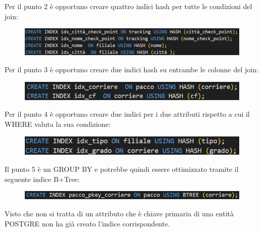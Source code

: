 \noindent Per il punto 2 è opportuno creare quattro indici hash per tutte le condizioni del join:
\begin{figure}[H]
\centering
\includegraphics[width=0.8 \textwidth]{Resources/INDEX2.png}
\label{I2}
\end{figure}

\noindent Per il punto 3 è opportuno creare due indici hash su entrambe le colonne del join:

\begin{figure}[H]
\centering
\includegraphics[width=0.8 \textwidth]{Resources/INDEX3.png}
\label{I3}
\end{figure}

\noindent Per il punto 4 è opportuno creare due indici per i due attributi rispetto a cui il WHERE valuta la sua condizione:

\begin{figure}[H]
\centering
\includegraphics[width=1 \textwidth]{Resources/INDEX4.png}
\label{I4}
\end{figure}

\noindent Il punto 5 è un GROUP BY e potrebbe quindi essere ottimizzato tramite il seguente indice B+Tree:
 
\begin{figure}[H]
\centering
\includegraphics[width=1 \textwidth]{Resources/INDEX5.png}
\label{I5}
\end{figure}  

\noindent Visto che non si tratta di un attributo che è chiave primaria di una entità POSTGRE non ha già creato l'indice corrispondente. 